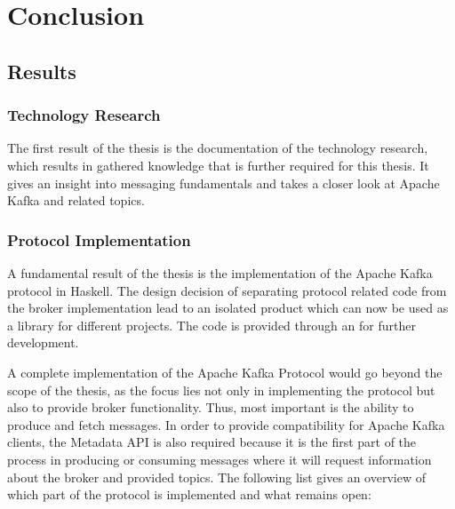 \chapter{Conclusion}
\section{Results}
\label{sec:conc-results}
\subsection{Technology Research}
The first result of the thesis is the documentation of the technology research,
which results in gathered knowledge that is further required for this
thesis. It gives an insight into messaging fundamentals and takes a closer look
at Apache Kafka and related topics.

\subsection{Protocol Implementation}

A fundamental result of the thesis is the implementation of the Apache Kafka
protocol in Haskell. The design decision of separating protocol related code
from the broker implementation lead to an isolated product which can now be used
as a library for different projects. The code is provided through an  for further development.

A complete implementation of the Apache Kafka Protocol would go beyond the scope
of the thesis, as the focus lies not only in implementing the protocol but also
to provide broker functionality. Thus, most important is the ability to produce
and fetch messages. In order to provide compatibility for Apache Kafka clients,
the Metadata API is also required because it is the first part of the
process in producing or consuming messages where it will request information
about the broker and provided topics. The following list gives an overview of
which part of the protocol is implemented and what remains open:

